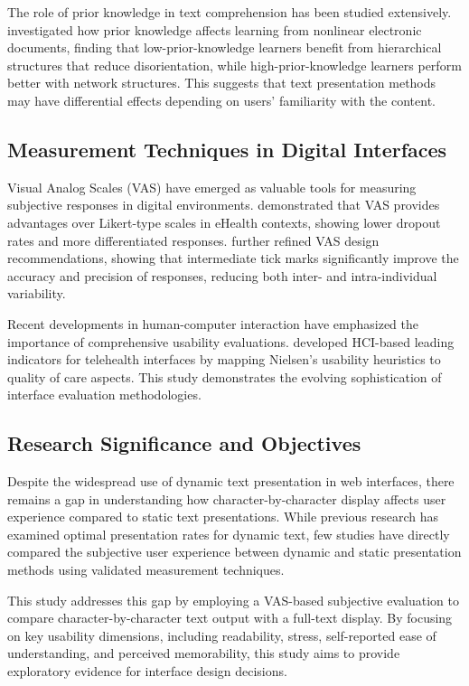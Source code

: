 \documentclass[authoryear]{elsarticle}
\begin{document}
The role of prior knowledge in text comprehension has been studied extensively. \citet{amadieu2009} investigated how prior knowledge affects learning from nonlinear electronic documents, finding that low-prior-knowledge learners benefit from hierarchical structures that reduce disorientation, while high-prior-knowledge learners perform better with network structures. This suggests that text presentation methods may have differential effects depending on users' familiarity with the content.

\subsection{Measurement Techniques in Digital Interfaces}
Visual Analog Scales (VAS) have emerged as valuable tools for measuring subjective responses in digital environments. \citet{kuhlmann2016} demonstrated that VAS provides advantages over Likert-type scales in eHealth contexts, showing lower dropout rates and more differentiated responses. \citet{garcia-perez2023} further refined VAS design recommendations, showing that intermediate tick marks significantly improve the accuracy and precision of responses, reducing both inter- and intra-individual variability.

Recent developments in human-computer interaction have emphasized the importance of comprehensive usability evaluations. \citet{khashe2023} developed HCI-based leading indicators for telehealth interfaces by mapping Nielsen's usability heuristics to quality of care aspects. This study demonstrates the evolving sophistication of interface evaluation methodologies.

\subsection{Research Significance and Objectives}
Despite the widespread use of dynamic text presentation in web interfaces, there remains a gap in understanding how character-by-character display affects user experience compared to static text presentations. While previous research has examined optimal presentation rates for dynamic text, few studies have directly compared the subjective user experience between dynamic and static presentation methods using validated measurement techniques.

This study addresses this gap by employing a VAS-based subjective evaluation to compare character-by-character text output with a full-text display. By focusing on key usability dimensions, including readability, stress, self-reported ease of understanding, and perceived memorability, this study aims to provide exploratory evidence for interface design decisions.
\end{document}
